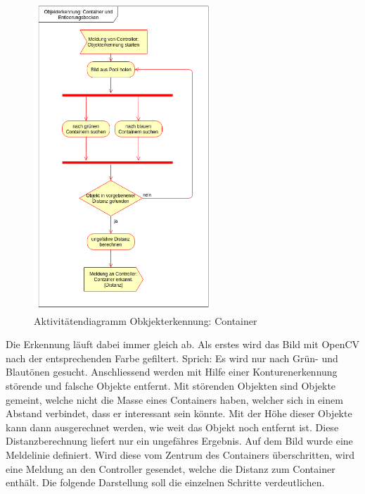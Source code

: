 \begin{figure}[H]%
\centering
\includegraphics[width=0.6\textwidth]{03_Loesungskonzept/pictures/objekterkennung_containers.png}
\caption{Aktivitätendiagramm Obkjekterkennung: Container}
\label{fig:activityContainer}
\end{figure}
\newpage
Die Erkennung läuft dabei immer gleich ab. Als erstes wird das Bild mit OpenCV nach der entsprechenden Farbe gefiltert. Sprich: Es wird nur nach Grün- und Blautönen gesucht. Anschliessend werden mit Hilfe einer Konturenerkennung störende und falsche Objekte entfernt. Mit störenden Objekten sind Objekte gemeint, welche nicht die Masse eines Containers haben, welcher sich in einem Abstand verbindet, dass er interessant sein könnte. Mit der Höhe dieser Objekte kann dann ausgerechnet werden, wie weit das Objekt  noch entfernt ist. Diese Distanzberechnung liefert nur ein ungefähres Ergebnis. Auf dem Bild wurde eine Meldelinie definiert. Wird diese vom Zentrum des Containers überschritten, wird eine Meldung an den Controller gesendet, welche die Distanz zum Container enthält. Die folgende Darstellung soll die einzelnen Schritte verdeutlichen.
